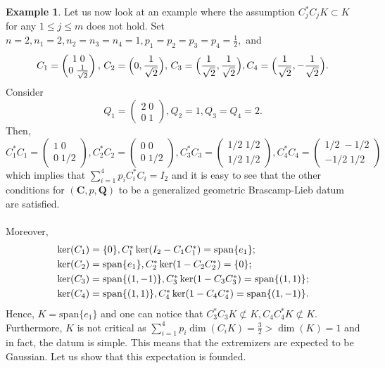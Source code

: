 \documentclass[11pt,a4paper,reqno]{amsart}
\numberwithin{equation}{section}
\theoremstyle{definition}
\newtheorem{example}[theorem]{Example}
\newcommand{\nm}{\noalign{\smallskip}}
\newcommand{\<}{\ensuremath \leq}
\renewcommand{\>}{\ensuremath \geq}
\begin{document}
\begin{example}

Let us now look at an example where the assumption $C_j^*C_jK \subset K$ for any $1 \leq j \leq m$ does not hold. 
    Set $n=2,n_1=2,n_2=n_3=n_4=1, p_1=p_2=p_3=p_4=\frac{1}{2},$ and $$C_1=\begin{pmatrix}
        1 \; 0 \\
        0 \; \frac{1}{\sqrt{2}}
    \end{pmatrix}, \, C_2=\Bigl(0,\frac{1}{\sqrt 2}\Bigl), \, C_3=\Bigl(\frac{1}{\sqrt 2},\frac{1}{\sqrt 2}\Bigl), C_4=\Bigl(\frac{1}{\sqrt 2},-\frac{1}{\sqrt 2}\Bigl).
   $$ Consider $$Q_1=\begin{pmatrix}
       2 \; 0 \\
       0 \; 1
   \end{pmatrix},Q_2=1,Q_3=Q_4=2.$$ Then, $$C_1^*C_1=\begin{pmatrix}
       1 \; 0 \\
       0 \; 1/2
   \end{pmatrix}, C_2^*C_2=\begin{pmatrix}
       0 \; 0 \\
       0 \; 1/2
   \end{pmatrix}, C_3^*C_3=\begin{pmatrix}
       1/2 \; 1/2 \\
       1/2 \; 1/2
   \end{pmatrix}, C_4^*C_4=\begin{pmatrix}
       1/2 \; -1/2 \\
       -1/2 \; 1/2
   \end{pmatrix}$$ which implies that $\sum_{i=1}^4 p_iC_i^*C_i=I_2$ and it is easy to see that the other conditions for $(\textbf{C},p,\textbf{Q})$ to be a generalized geometric Brascamp-Lieb datum are satisfied. \hfill \\ \\ Moreover, $$\begin{array}{lll}
   \ker(C_1)=\{0\}, C_1^*\ker(I_2-C_1C_1^*)=\mathrm{span}\{e_1\}; \\
   \nm 
   \ker(C_2)=\mathrm{span}\{e_1\}, C_2^*\ker(1-C_2C_2^*)=\{0\}; \\
   \nm 
   \ker(C_3)=\mathrm{span}\{(1,-1)\}, C_3^*\ker(1-C_3C_3^*)=\mathrm{span}\{(1,1)\}; \\
   \nm 
   \ker(C_4)=\mathrm{span}\{(1,1)\}, C_4^*\ker(1-C_4C_4^*)=\mathrm{span}\{(1,-1)\}.\end{array}$$ Hence, $K=\mathrm{span}\{e_1\}$ and one can notice that $C_3^*C_3K \not \subset K, C_4C_4^*K \not \subset K.$ Furthermore, $K$ is not critical as $\sum_{i=1}^4 p_i\dim(C_iK)=\frac{3}{2}>\dim(K)=1$ and in fact, the datum is simple. This means that the extremizers are expected to be Gaussian. Let us show that this expectation is founded. 

\end{example}
\end{document}
